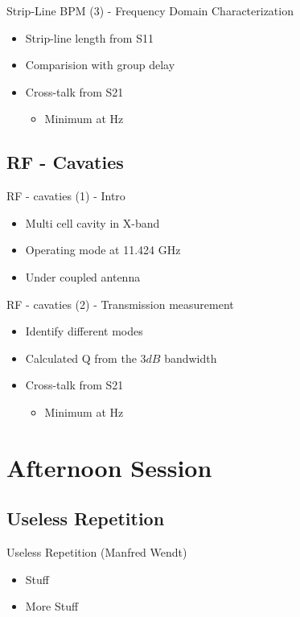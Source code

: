 \documentclass{beamer}
\begin{document}
\begin{frame}[t,fragile]{Strip-Line BPM (3) - Frequency Domain Characterization}
\begin{itemize}
\item Strip-line length from S11
\item Comparision with group delay
\item Cross-talk from S21
\begin{itemize}
\item Minimum at Hz
\end{itemize}
\end{itemize}
\end{frame}

\subsection{RF - Cavaties}
\begin{frame}[t,fragile]{RF - cavaties (1) - Intro}
\begin{itemize}
\item Multi cell cavity in X-band
\item Operating mode at 11.424 GHz
\item Under coupled antenna
\end{itemize}
\end{frame}

\begin{frame}[t,fragile]{RF - cavaties (2) - Transmission measurement}
\begin{itemize}
\item Identify different modes 
\item Calculated Q from the $3 dB$ bandwidth
\item Cross-talk from S21
\begin{itemize}
\item Minimum at Hz
\end{itemize}
\end{itemize}
\end{frame}

\section{Afternoon Session}
\subsection{Useless Repetition}
\begin{frame}[t,fragile]{Useless Repetition (Manfred Wendt)}
\begin{itemize}
\item Stuff
\item More Stuff
\end{itemize}
\end{frame}
\end{document}
